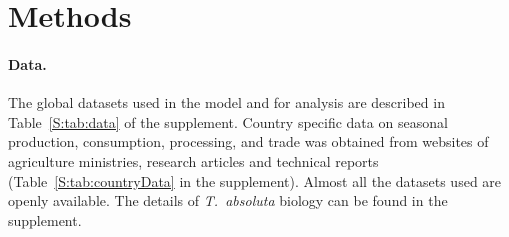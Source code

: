\documentclass[11pt]{article}
\newcommand{\tuta}{\emph{T.~absoluta}}
\theoremstyle{definition}
\begin{document}
\section{Methods}
\paragraph{Data.} The global datasets used in the model and for analysis
are described in Table~\ref{S:tab:data} of the supplement. Country specific
data on seasonal production, consumption, processing, and trade was obtained
from websites of agriculture ministries, research articles and technical
reports (Table~\ref{S:tab:countryData} in the supplement). Almost all the
datasets used are openly available. The details of \tuta{} biology can be
found in the supplement. 
\end{document}
